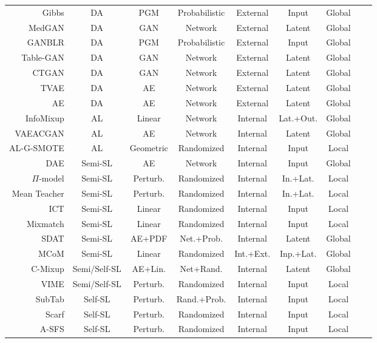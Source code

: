 \begin{longtable}{rcccccccc}
    Gibbs & DA & PGM & Probabilistic & External & Input & Global \\
    MedGAN & DA & GAN & Network & External & Latent & Global \\
    GANBLR & DA & PGM & Probabilistic & External & Input & Global \\
    Table-GAN & DA & GAN & Network & External & Latent & Global \\
    CTGAN & DA & GAN & Network & External & Latent & Global \\
    TVAE & DA & AE & Network & External & Latent & Global \\
    AE & DA & AE & Network & External & Latent & Global \\
    InfoMixup & AL & Linear & Network & Internal & Lat.+Out. & Global \\
    VAEACGAN & AL & AE & Network & Internal & Latent & Global\\
    AL-G-SMOTE & AL & Geometric & Randomized & Internal & Input & Local\\
    DAE & Semi-SL & AE & Network & Internal & Input & Global \\ 
    $\Pi$-model & Semi-SL & Perturb. & Randomized & Internal & In.+Lat. & Local \\
    Mean Teacher & Semi-SL & Perturb. & Randomized & Internal & In.+Lat. & Local \\
    ICT & Semi-SL & Linear & Randomized & Internal & Input & Local \\
    Mixmatch & Semi-SL & Linear & Randomized & Internal & Input & Local \\
    SDAT & Semi-SL & AE+PDF & Net.+Prob. & Internal & Latent & Global \\
    MCoM & Semi-SL & Linear & Randomized & Int.+Ext. & Inp.+Lat. & Global \\
    C-Mixup & Semi/Self-SL & AE+Lin. & Net+Rand.  & Internal & Latent & Global \\
    VIME & Semi/Self-SL & Perturb. & Randomized & Internal & Input & Local \\
    SubTab & Self-SL & Perturb. & Rand.+Prob. & Internal & Input & Local \\
    Scarf & Self-SL & Perturb. & Randomized & Internal & Input & Local \\
    A-SFS & Self-SL & Perturb. & Randomized & Internal & Input & Local \\
\end{longtable}
\endgroup

